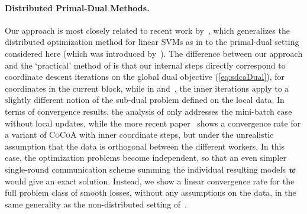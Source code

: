 \documentclass{article} %
\newcommand{\algname}{\textsc{CoCoA}\xspace}  %
\begin{document}
\paragraph{Distributed Primal-Dual Methods.}
Our approach is most closely related to recent work by~\cite{Yang:2013vl,Yang:2013ui}, which generalizes the 
distributed optimization method for linear SVMs as in \cite{Yu:2010ct} 
to the primal-dual setting considered here
(which was introduced by~\cite{ShalevShwartz:2013wl}).
The difference between our approach and the `practical' method of \cite{Yang:2013vl}
is that our internal steps directly correspond to coordinate descent iterations
on the global dual objective (\ref{eq:sdcaDual}), for coordinates in the current 
block, while in \cite[Equation~8]{Yang:2013ui} and~\cite{Yang:2013vl}, the inner
iterations apply to a slightly different notion of the sub-dual problem defined 
on the local data. In terms of convergence results, the analysis of \cite{Yang:2013vl}
only addresses the mini-batch case without local updates, while the more recent paper~\cite{Yang:2013ui} shows a convergence rate for a variant of \algname with inner coordinate steps, but under the unrealistic assumption that the data is orthogonal
between the different workers. In this case, the optimization problems become
independent, so that an even simpler single-round communication scheme 
summing the individual resulting models ${\bm{w}}$ would give an exact solution. 
Instead, we show a linear convergence rate for the full problem class of smooth 
losses, without any assumptions on the data, in the same generality as the 
non-distributed setting of~\cite{ShalevShwartz:2013wl}.
\end{document}
